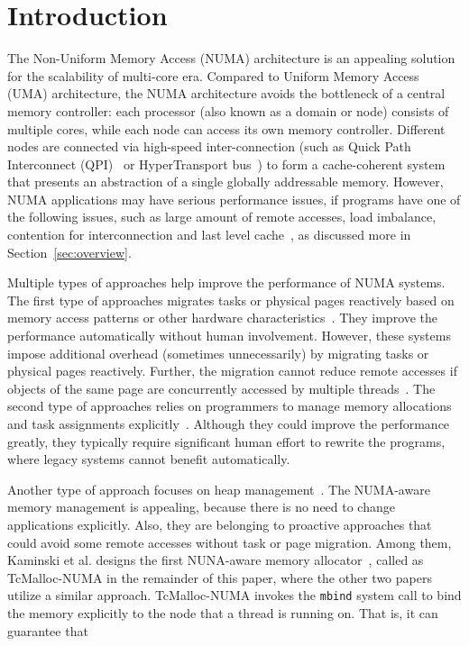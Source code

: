 
\section{Introduction}
\label{sec:intro}

The Non-Uniform Memory Access (NUMA) architecture is an appealing solution for the scalability of multi-core era. Compared to Uniform Memory Access (UMA) architecture, the NUMA architecture avoids the bottleneck of a central memory controller: each processor (also known as a domain or node) consists of multiple cores, while each node can access its own memory controller. Different nodes are connected via high-speed inter-connection (such as Quick Path Interconnect (QPI)~\cite{intelqpi} or HyperTransport bus~\cite{hypertransport}) to form a cache-coherent system that presents an abstraction of a single globally addressable memory. 
However, NUMA applications may have serious performance issues, if programs have one of the following issues, such as large amount of remote accesses, load imbalance, contention for interconnection and last level cache~\cite{Blagodurov:2011:CNC:2002181.2002182, Dashti:2013:TMH:2451116.2451157}, as discussed more in Section~\ref{sec:overview}. 

Multiple types of approaches help improve the performance of NUMA systems. The first type of approaches migrates tasks or physical pages reactively based on memory access patterns or other hardware characteristics~\cite{Blagodurov:2011:CNC:2002181.2002182, AutoNUMA, Dashti:2013:TMH:2451116.2451157, Lepers:2015:TMP:2813767.2813788}. They improve the performance automatically without human involvement. However, these systems impose additional overhead (sometimes unnecessarily)  by migrating tasks or physical pages reactively. Further, the migration cannot reduce remote accesses if objects of the same page are concurrently accessed by multiple threads~\cite{Gaud:2014:LPM:2643634.2643659}. 
The second type of approaches relies on programmers to manage memory allocations and task assignments explicitly~\cite{Kaestle:2015:SSA:2813767.2813787, Lin:2016:MTP:2872362.2872401, Majo:2017:LPC:3057718.3040222}. Although they could improve the performance greatly, they typically require significant human effort to rewrite the programs, where legacy systems cannot benefit automatically. 

Another type of approach focuses on heap management~\cite{tcmallocnew, kim2013node, yang2019jarena}. The NUMA-aware memory management is appealing, because there is no need to change applications explicitly. Also, they are belonging to proactive approaches that could avoid some remote accesses without task or page migration. Among them, Kaminski et al. designs the first NUNA-aware memory allocator~\cite{tcmallocnew}, called as TcMalloc-NUMA in the remainder of this paper, where the other two papers utilize a similar approach. TcMalloc-NUMA invokes the \texttt{mbind} system call to bind the memory explicitly to the node that a thread is running on. That is, it can guarantee that 

